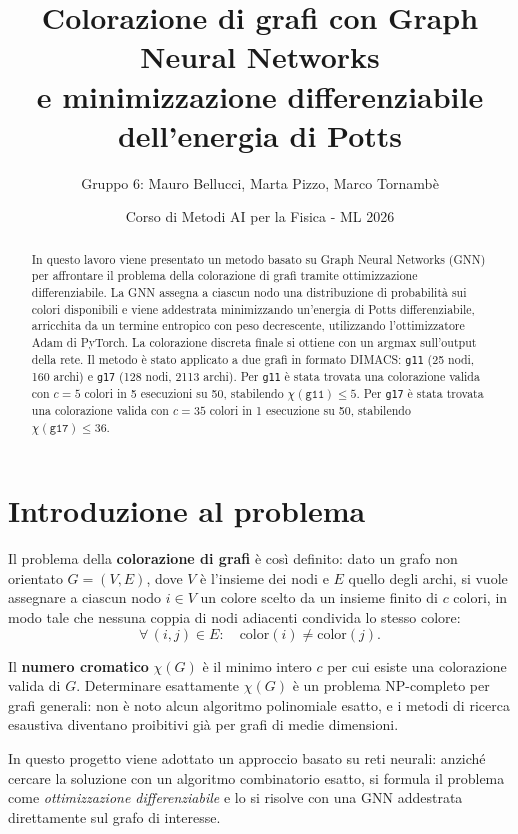 \documentclass{article}
\title{\textbf{Colorazione di grafi con Graph Neural Networks\\
e minimizzazione differenziabile dell'energia di Potts}}
\author{Gruppo 6: Mauro Bellucci, Marta Pizzo, Marco Tornambè}
\date{Corso di Metodi AI per la Fisica - ML 2026}
\begin{document}
\maketitle

\begin{abstract}
In questo lavoro viene presentato un metodo basato su Graph Neural Networks (GNN) per
affrontare il problema della colorazione di grafi tramite ottimizzazione differenziabile.
La GNN assegna a ciascun nodo una distribuzione di probabilità sui colori disponibili e
viene addestrata minimizzando un'energia di Potts differenziabile, arricchita da un termine
entropico con peso decrescente, utilizzando l'ottimizzatore Adam di PyTorch. La colorazione
discreta finale si ottiene con un argmax sull'output della rete. Il metodo è stato applicato
a due grafi in formato DIMACS: \texttt{g11} (25 nodi, 160 archi) e \texttt{g17} (128
nodi, 2113 archi). Per \texttt{g11} è stata trovata una colorazione valida con $c = 5$
colori in 5 esecuzioni su 50, stabilendo $\chi(\texttt{g11}) \leq 5$. Per \texttt{g17}
è stata trovata una colorazione valida con $c = 35$ colori in 1 esecuzione su 50,
stabilendo $\chi(\texttt{g17}) \leq 36$.
\end{abstract}

\section{Introduzione al problema}

Il problema della \textbf{colorazione di grafi} è così definito: dato un grafo non orientato $G = (V, E)$,
dove $V$ è l'insieme dei nodi e $E$ quello degli archi, si vuole assegnare a ciascun nodo
$i \in V$ un colore scelto da un insieme finito di $c$ colori, in modo tale che nessuna
coppia di nodi adiacenti condivida lo stesso colore:
\begin{equation}
    \forall\,(i,j) \in E: \quad \mathrm{color}(i) \neq \mathrm{color}(j).
\end{equation}

Il \textbf{numero cromatico} $\chi(G)$ è il minimo intero $c$ per cui esiste una
colorazione valida di $G$. Determinare esattamente $\chi(G)$ è un problema NP-completo
per grafi generali: non è noto alcun algoritmo polinomiale esatto, e i metodi di ricerca
esaustiva diventano proibitivi già per grafi di medie dimensioni.

In questo progetto viene adottato un approccio basato su reti neurali:
anziché cercare la soluzione con un algoritmo combinatorio esatto, si formula il problema
come \emph{ottimizzazione differenziabile} e lo si risolve con una GNN addestrata
direttamente sul grafo di interesse.
\end{document}
